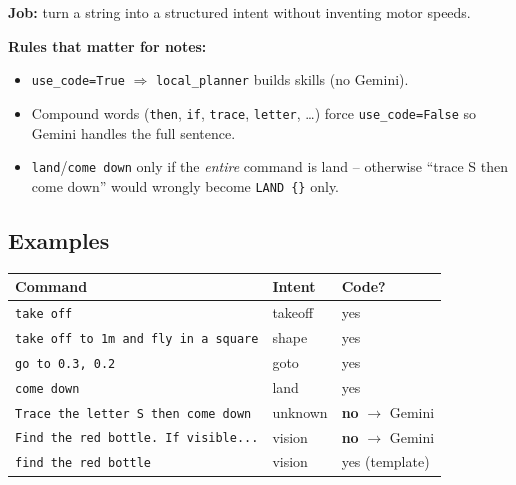 \documentclass[11pt,a4paper]{article}
\begin{document}
\textbf{Job:} turn a string into a structured intent without inventing motor speeds.

\begin{center}
\end{center}

\textbf{Rules that matter for notes:}
\begin{itemize}[itemsep=2pt]
\item \texttt{use\_code=True} $\Rightarrow$ \texttt{local\_planner} builds skills (no Gemini).
\item Compound words (\texttt{then}, \texttt{if}, \texttt{trace}, \texttt{letter}, \ldots)
force \texttt{use\_code=False} so Gemini handles the full sentence.
\item \texttt{land}/\texttt{come down} only if the \emph{entire} command is land -- otherwise
``trace S then come down'' would wrongly become \texttt{LAND \{\}} only.
\end{itemize}

\subsection*{Examples}
\begin{center}
\small
\begin{tabular}{p{6.5cm}ll}
\toprule
\textbf{Command} & \textbf{Intent} & \textbf{Code?} \\
\midrule
\texttt{take off} & takeoff & yes \\
\texttt{take off to 1m and fly in a square} & shape & yes \\
\texttt{go to 0.3, 0.2} & goto & yes \\
\texttt{come down} & land & yes \\
\texttt{Trace the letter S then come down} & unknown & \textbf{no} $\to$ Gemini \\
\texttt{Find the red bottle. If visible...} & vision & \textbf{no} $\to$ Gemini \\
\texttt{find the red bottle} & vision & yes (template) \\
\bottomrule
\end{tabular}
\end{center}
\end{document}
